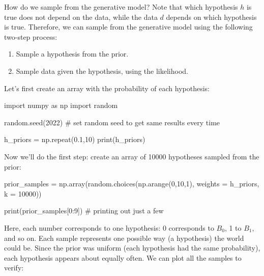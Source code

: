 \documentclass[
  letterpaper,
  DIV=11,
  numbers=noendperiod]{scrreprt}
\newenvironment{Shaded}{\begin{snugshade}}{\end{snugshade}}
\newcommand{\BuiltInTok}[1]{\textcolor[rgb]{0.00,0.23,0.31}{#1}}
\newcommand{\CommentTok}[1]{\textcolor[rgb]{0.37,0.37,0.37}{#1}}
\newcommand{\DecValTok}[1]{\textcolor[rgb]{0.68,0.00,0.00}{#1}}
\newcommand{\FloatTok}[1]{\textcolor[rgb]{0.68,0.00,0.00}{#1}}
\newcommand{\ImportTok}[1]{\textcolor[rgb]{0.00,0.46,0.62}{#1}}
\newcommand{\NormalTok}[1]{\textcolor[rgb]{0.00,0.23,0.31}{#1}}
\newcommand{\OperatorTok}[1]{\textcolor[rgb]{0.37,0.37,0.37}{#1}}
\providecommand{\tightlist}{%
  \setlength{\itemsep}{0pt}\setlength{\parskip}{0pt}}
\begin{document}
How do we sample from the generative model? Note that which hypothesis
\(h\) is true does not depend on the data, while the data \(d\) depends
on which hypothesis is true. Therefore, we can sample from the
generative model using the following two-step process:

\begin{enumerate}
\def\labelenumi{\arabic{enumi}.}
\tightlist
\item
  Sample a hypothesis from the prior.
\item
  Sample data given the hypothesis, using the likelihood.
\end{enumerate}

Let's first create an array with the probability of each hypothesis:

\begin{Shaded}
\begin{Highlighting}[]
\ImportTok{import}\NormalTok{ numpy }\ImportTok{as}\NormalTok{ np}
\ImportTok{import}\NormalTok{ random}

\NormalTok{random.seed(}\DecValTok{2022}\NormalTok{) }\CommentTok{\# set random seed to get same results every time}

\NormalTok{h\_priors }\OperatorTok{=}\NormalTok{ np.repeat(}\FloatTok{0.1}\NormalTok{,}\DecValTok{10}\NormalTok{)}
\BuiltInTok{print}\NormalTok{(h\_priors)}
\end{Highlighting}
\end{Shaded}

Now we'll do the first step: create an array of 10000 hypotheses sampled
from the prior:

\begin{Shaded}
\begin{Highlighting}[]
\NormalTok{prior\_samples }\OperatorTok{=}\NormalTok{ np.array(random.choices(np.arange(}\DecValTok{0}\NormalTok{,}\DecValTok{10}\NormalTok{,}\DecValTok{1}\NormalTok{),}
\NormalTok{                   weights }\OperatorTok{=}\NormalTok{ h\_priors, }
\NormalTok{                   k }\OperatorTok{=} \DecValTok{10000}\NormalTok{))}
                   
\BuiltInTok{print}\NormalTok{(prior\_samples[}\DecValTok{0}\NormalTok{:}\DecValTok{9}\NormalTok{]) }\CommentTok{\# printing out just a few}
\end{Highlighting}
\end{Shaded}

Here, each number corresponds to one hypothesis: 0 corresponds to
\(B_0\), 1 to \(B_1\), and so on. Each sample represents one possible
way (a hypothesis) the world could be. Since the prior was uniform (each
hypothesis had the same probability), each hypothesis appears about
equally often. We can plot all the samples to verify:
\end{document}
